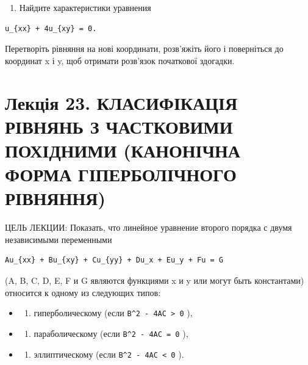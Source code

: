 \documentclass[
  ukrainian,
]{article}
\providecommand{\tightlist}{%
  \setlength{\itemsep}{0pt}\setlength{\parskip}{0pt}}
\begin{document}
\begin{enumerate}
\def\labelenumi{\arabic{enumi}.}
\setcounter{enumi}{5}
\tightlist
\item
  Найдите характеристики уравнения
\end{enumerate}

\begin{verbatim}
u_{xx} + 4u_{xy} = 0.
\end{verbatim}

Перетворіть рівняння на нові координати, розв'яжіть його і поверніться
до координат x і y, щоб отримати розв'язок початкової здогадки.

\section{Лекція 23. КЛАСИФІКАЦІЯ РІВНЯНЬ З ЧАСТКОВИМИ ПОХІДНИМИ
(КАНОНІЧНА ФОРМА ГІПЕРБОЛІЧНОГО
РІВНЯННЯ)}\label{ux43bux435ux43aux446ux456ux44f-23.-ux43aux43bux430ux441ux438ux444ux456ux43aux430ux446ux456ux44f-ux440ux456ux432ux43dux44fux43dux44c-ux437-ux447ux430ux441ux442ux43aux43eux432ux438ux43cux438-ux43fux43eux445ux456ux434ux43dux438ux43cux438-ux43aux430ux43dux43eux43dux456ux447ux43dux430-ux444ux43eux440ux43cux430-ux433ux456ux43fux435ux440ux431ux43eux43bux456ux447ux43dux43eux433ux43e-ux440ux456ux432ux43dux44fux43dux43dux44f}

ЦЕЛЬ ЛЕКЦИИ: Показать, что линейное уравнение второго порядка с двумя
независимыми переменными

\begin{verbatim}
Au_{xx} + Bu_{xy} + Cu_{yy} + Du_x + Eu_y + Fu = G
\end{verbatim}

(A, B, C, D, E, F и G являются функциями x и y или могут быть
константами) относится к одному из следующих типов:

\begin{itemize}
\tightlist
\item
  \begin{enumerate}
  \def\labelenumi{\arabic{enumi})}
  \tightlist
  \item
    гиперболическому (если \texttt{B\^{}2\ -\ 4AC\ \textgreater{}\ 0} ),
  \end{enumerate}
\item
  \begin{enumerate}
  \def\labelenumi{\arabic{enumi})}
  \setcounter{enumi}{1}
  \tightlist
  \item
    параболическому (если \texttt{B\^{}2\ -\ 4AC\ =\ 0} ),
  \end{enumerate}
\item
  \begin{enumerate}
  \def\labelenumi{\arabic{enumi})}
  \setcounter{enumi}{2}
  \tightlist
  \item
    эллиптическому (если \texttt{B\^{}2\ -\ 4AC\ \textless{}\ 0} ).
  \end{enumerate}
\end{itemize}
\end{document}
